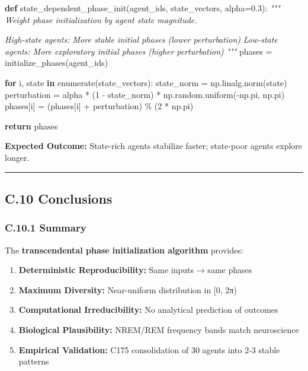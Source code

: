 \documentclass[
]{article}
\newenvironment{Shaded}{}{}
\newcommand{\BuiltInTok}[1]{\textcolor[rgb]{0.00,0.50,0.00}{#1}}
\newcommand{\CommentTok}[1]{\textcolor[rgb]{0.38,0.63,0.69}{\textit{#1}}}
\newcommand{\ControlFlowTok}[1]{\textcolor[rgb]{0.00,0.44,0.13}{\textbf{#1}}}
\newcommand{\DecValTok}[1]{\textcolor[rgb]{0.25,0.63,0.44}{#1}}
\newcommand{\FloatTok}[1]{\textcolor[rgb]{0.25,0.63,0.44}{#1}}
\newcommand{\KeywordTok}[1]{\textcolor[rgb]{0.00,0.44,0.13}{\textbf{#1}}}
\newcommand{\NormalTok}[1]{#1}
\newcommand{\OperatorTok}[1]{\textcolor[rgb]{0.40,0.40,0.40}{#1}}
\providecommand{\tightlist}{%
  \setlength{\itemsep}{0pt}\setlength{\parskip}{0pt}}
\begin{document}
\begin{Shaded}
\begin{Highlighting}[]
\KeywordTok{def}\NormalTok{ state\_dependent\_phase\_init(agent\_ids, state\_vectors, alpha}\OperatorTok{=}\FloatTok{0.3}\NormalTok{):}
    \CommentTok{"""}
\CommentTok{    Weight phase initialization by agent state magnitude.}

\CommentTok{    High{-}state agents: More stable initial phases (lower perturbation)}
\CommentTok{    Low{-}state agents: More exploratory initial phases (higher perturbation)}
\CommentTok{    """}
\NormalTok{    phases }\OperatorTok{=}\NormalTok{ initialize\_phases(agent\_ids)}

    \ControlFlowTok{for}\NormalTok{ i, state }\KeywordTok{in} \BuiltInTok{enumerate}\NormalTok{(state\_vectors):}
\NormalTok{        state\_norm }\OperatorTok{=}\NormalTok{ np.linalg.norm(state)}
\NormalTok{        perturbation }\OperatorTok{=}\NormalTok{ alpha }\OperatorTok{*}\NormalTok{ (}\DecValTok{1} \OperatorTok{{-}}\NormalTok{ state\_norm) }\OperatorTok{*}\NormalTok{ np.random.uniform(}\OperatorTok{{-}}\NormalTok{np.pi, np.pi)}
\NormalTok{        phases[i] }\OperatorTok{=}\NormalTok{ (phases[i] }\OperatorTok{+}\NormalTok{ perturbation) }\OperatorTok{\%}\NormalTok{ (}\DecValTok{2} \OperatorTok{*}\NormalTok{ np.pi)}

    \ControlFlowTok{return}\NormalTok{ phases}
\end{Highlighting}
\end{Shaded}

\textbf{Expected Outcome:} State-rich agents stabilize faster;
state-poor agents explore longer.

\begin{center}\rule{0.5\linewidth}{0.5pt}\end{center}

\subsection{C.10 Conclusions}\label{c.10-conclusions}

\subsubsection{C.10.1 Summary}\label{c.10.1-summary}

The \textbf{transcendental phase initialization algorithm} provides:

\begin{enumerate}
\def\labelenumi{\arabic{enumi}.}
\tightlist
\item
  \textbf{Deterministic Reproducibility:} Same inputs → same phases
\item
  \textbf{Maximum Diversity:} Near-uniform distribution in {[}0, 2π)
\item
  \textbf{Computational Irreducibility:} No analytical prediction of
  outcomes
\item
  \textbf{Biological Plausibility:} NREM/REM frequency bands match
  neuroscience
\item
  \textbf{Empirical Validation:} C175 consolidation of 30 agents into
  2-3 stable patterns
\end{enumerate}
\end{document}
